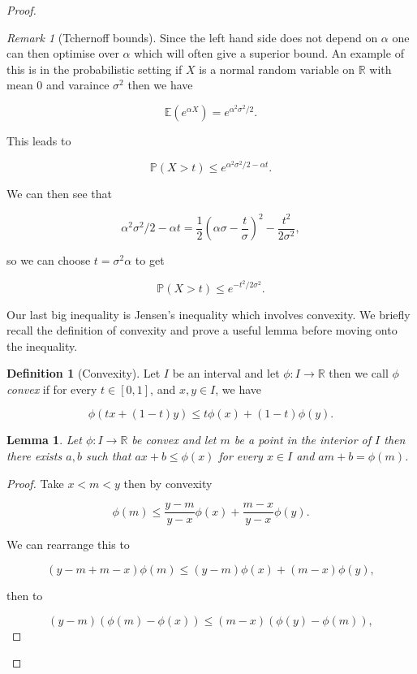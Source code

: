 \documentclass[
]{book}
\newtheorem{lemma}{Lemma}[chapter]
\theoremstyle{definition}
\newtheorem{definition}{Definition}[chapter]
\theoremstyle{definition}
\theoremstyle{definition}
\theoremstyle{definition}
\theoremstyle{remark}
\newtheorem*{remark}{Remark}
\begin{document}
\begin{proof}
\begin{remark}[Tchernoff bounds]
Since the left hand side does not depend on \(\alpha\) one can then optimise over \(\alpha\) which will often give a superior bound. An example of this is in the probabilistic setting if \(X\) is a normal random variable on \(\mathbb{R}\) with mean 0 and varaince \(\sigma^2\) then we have

\[ \mathbb{E}\left( e^{\alpha X}\right) = e^{\alpha^2 \sigma^2/2}. \]

This leads to

\[ \mathbb{P}(X> t) \leq e^{\alpha^2 \sigma^2/2-\alpha t}. \]

We can then see that

\[ \alpha^2 \sigma^2/2 - \alpha t = \frac{1}{2}\left(\alpha \sigma - \frac{t}{ \sigma} \right)^2 - \frac{t^2}{2 \sigma^2}, \]

so we can choose \(t= \sigma^2 \alpha\) to get

\[ \mathbb{P}(X > t) \leq e^{-t^2/2\sigma^2}.  \]
\end{remark}

Our last big inequality is Jensen's inequality which involves convexity. We briefly recall the definition of convexity and prove a useful lemma before moving onto the inequality.

\begin{definition}[Convexity]
Let \(I\) be an interval and let \(\phi: I \rightarrow \mathbb{R}\) then we call \(\phi\) \emph{convex} if for every \(t \in [0,1]\), and \(x,y \in I\), we have

\[\phi(tx +(1-t)y) \leq t\phi(x) + (1-t)\phi(y).\]
\end{definition}

\begin{lemma}
Let \(\phi: I \rightarrow \mathbb{R}\) be convex and let \(m\) be a point in the interior of \(I\) then there exists \(a,b\) such that \(ax+b \leq \phi(x)\) for every \(x \in I\) and \(am+b = \phi(m)\).
\end{lemma}

\begin{proof}
Take \(x<m<y\) then by convexity

\[ \phi(m) \leq \frac{y-m}{y-x} \phi(x) + \frac{m-x}{y-x} \phi(y). \]

We can rearrange this to

\[ (y-m + m-x) \phi(m) \leq (y-m) \phi(x) + (m-x) \phi(y), \]

then to

\[ (y-m)(\phi(m)-\phi(x)) \leq (m-x)(\phi(y)-\phi(m)), \]


\end{proof}
\end{proof}
\end{document}
